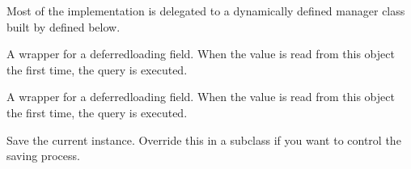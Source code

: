 \documentclass[letterpaper,10pt,french]{sphinxmanual}
\begin{document}
\begin{fulllineitems}
\begin{fulllineitems}
\sphinxAtStartPar
Most of the implementation is delegated to a dynamically defined manager
class built by  defined below.

\end{fulllineitems}


\begin{fulllineitems}
\label{\detokenize{main/model:main.models.Evaluation.objects}}
\pysigstartsignatures
{}
\pysigstopsignatures
\end{fulllineitems}


\begin{fulllineitems}
\label{\detokenize{main/model:main.models.Evaluation.ponderation}}
\pysigstartsignatures
{}
\pysigstopsignatures
\sphinxAtStartPar
A wrapper for a deferred\sphinxhyphen{}loading field. When the value is read from this
object the first time, the query is executed.

\end{fulllineitems}


\begin{fulllineitems}
\label{\detokenize{main/model:main.models.Evaluation.rattrapage}}
\pysigstartsignatures
{}
\pysigstopsignatures
\sphinxAtStartPar
A wrapper for a deferred\sphinxhyphen{}loading field. When the value is read from this
object the first time, the query is executed.

\end{fulllineitems}


\begin{fulllineitems}
\label{\detokenize{main/model:main.models.Evaluation.save}}
\pysigstartsignatures
{}
\pysigstopsignatures
\sphinxAtStartPar
Save the current instance. Override this in a subclass if you want to
control the saving process.


\end{fulllineitems}
\end{fulllineitems}
\end{document}
